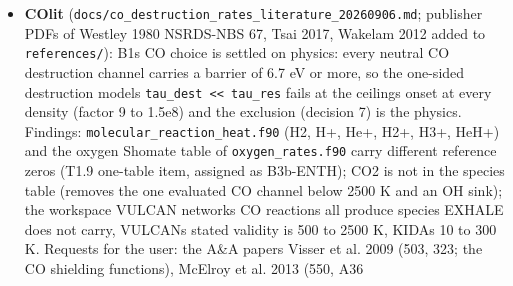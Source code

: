 \documentclass[english,a4paper]{my_memo}
\begin{document}
\begin{itemize}
  reports of \texttt{EXHALE\_main.f90} now state the B2/B2b behavior.
\item
  \textbf{COlit} (\texttt{docs/co\_destruction\_rates\_literature\_20260906.md}; publisher
  PDFs of Westley 1980 NSRDS-NBS 67, Tsai 2017, Wakelam 2012 added to
  \texttt{references/}): B1\textquotesingle s CO choice is settled on physics: every neutral CO
  destruction channel carries a barrier of 6.7 eV or more, so the one-sided
  destruction model\textquotesingle s \texttt{tau\_dest\ \textless{}\textless{}\ tau\_res} fails at the ceiling\textquotesingle s onset at
  every density (factor 9 to 1.5e8) and the exclusion (decision 7) is the
  physics. Findings: \texttt{molecular\_reaction\_heat.f90} (H2, H+, He+, H2+, H3+,
  HeH+) and the oxygen Shomate table of \texttt{oxygen\_rates.f90} carry different
  reference zeros (T1.9 one-table item, assigned as B3b-ENTH); CO2 is not in
  the species table (removes the one evaluated CO channel below 2500 K and
  an OH sink); the workspace VULCAN network\textquotesingle s CO reactions all produce
  species EXHALE does not carry, VULCAN\textquotesingle s stated validity is 500 to 2500 K,
  KIDA\textquotesingle s 10 to 300 K. Requests for the user: the A\&A papers Visser et al.
  2009 (503, 323; the CO shielding functions), McElroy et al. 2013 (550, A36


\end{itemize}
\end{document}
